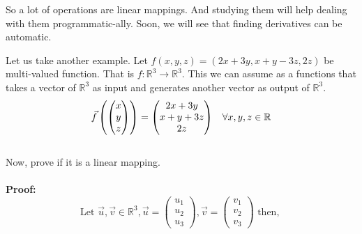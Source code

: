 \documentclass{article}
\begin{document}
So a lot of operations are linear mappings. And studying them will help dealing with them programmatic-ally. Soon, we will see that finding derivatives can be automatic. \par

Let us take another example. Let $f(x,y,z)=(2x+3y,x+y-3z,2z)$ be multi-valued function. That is $f:\mathbb{R}^3\rightarrow\mathbb{R}^3$. This we can assume as a functions that takes a vector of $\mathbb{R}^3$ as input and generates another vector as output of $\mathbb{R}^3$.
\[
\vec{f}\left(\begin{pmatrix}
x\\y\\z
\end{pmatrix}\right)=
\begin{pmatrix}
2x + 3y\\
x + y + 3z\\
2z
\end{pmatrix}
\hspace{3mm}
\forall x, y, z \in \mathbb{R}
\]
\\
Now, prove if it is a linear mapping.\\\\
\textbf{Proof:}
\[
\text{Let } \Vec{u},\Vec{v} \in \mathbb{R}^3, \Vec{u} =
\begin{pmatrix}
u_1\\u_2\\u_3
\end{pmatrix},
\Vec{v}=
\begin{pmatrix}
 v_1\\v_2\\v_3
\end{pmatrix}
\text{ then, }
\]
\end{document}
